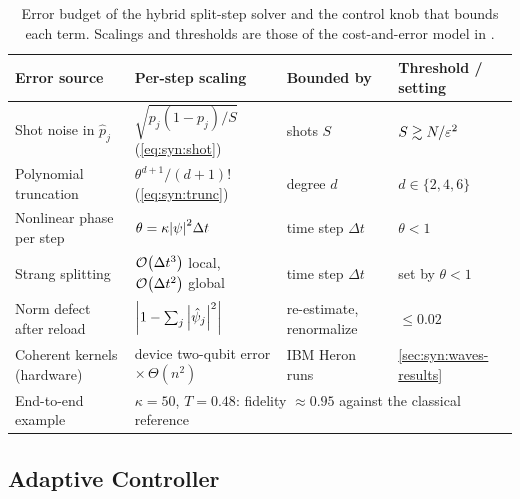 \begin{table}[htbp]
\caption{Error budget of the hybrid split-step solver and the control knob that bounds each term. Scalings and thresholds are those of the cost-and-error model in \cite{guo2026nonlinearwaves}.}
\label{tab:syn:errorbudget}
\centering\footnotesize
\begin{tabularx}{\textwidth}{@{}p{3.0cm} X p{2.5cm} p{2.9cm}@{}}
\toprule
Error source & Per-step scaling & Bounded by & Threshold / setting \\
\midrule
Shot noise in $\hat p_j$ & $\sqrt{p_j(1-p_j)/S}$ (\cref{eq:syn:shot}) & shots $S$ & $S\gtrsim N/\varepsilon^{2}$ \\
Polynomial truncation & $\theta^{d+1}/(d+1)!$ (\cref{eq:syn:trunc}) & degree $d$ & $d\in\{2,4,6\}$ \\
Nonlinear phase per step & $\theta=\kappa\abs{\psi}^{2}\Delta t$ & time step $\Delta t$ & $\theta<1$ \\
Strang splitting & $\mathcal{O}\!\left(\Delta t^{3}\right)$ local, $\mathcal{O}\!\left(\Delta t^{2}\right)$ global & time step $\Delta t$ & set by $\theta<1$ \\
Norm defect after reload & $\abs{1-\sum_j\abs{\hat\psi_j}^{2}}$ & re-estimate, renormalize & $\le 0.02$ \\
Coherent kernels (hardware) & device two-qubit error $\times\,\Theta(n^{2})$ & IBM Heron runs & \cref{sec:syn:waves-results} \\
\midrule
End-to-end example & \multicolumn{3}{l}{$\kappa=50$, $T=0.48$: fidelity $\approx 0.95$ against the classical reference} \\
\bottomrule
\end{tabularx}
\end{table}

\subsection{Adaptive Controller}\label{sec:syn:controller}

